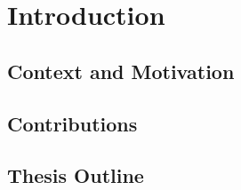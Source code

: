 \chapter{Introduction}
\label{ch:introduction}

\section{Context and Motivation}
\section{Contributions}
\section{Thesis Outline}
